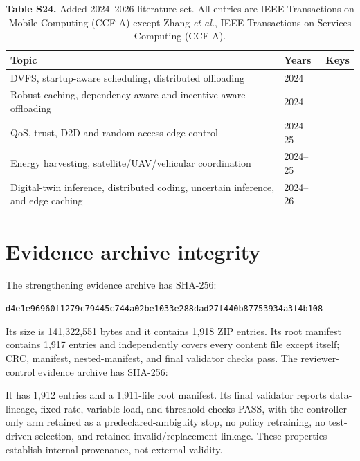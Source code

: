 \documentclass[10pt,a4paper]{article}
\begin{document}
\begin{table}[h!]
\centering\scriptsize
\caption*{\textbf{Table S24.} Added 2024--2026 literature set. All entries are IEEE Transactions on Mobile Computing (CCF-A) except Zhang \emph{et al.}, IEEE Transactions on Services Computing (CCF-A).}
\begin{tabular}{p{}ll}
\toprule
Topic & Years & Keys\\\midrule
DVFS, startup-aware scheduling, distributed offloading & 2024 & \cite{Zhang2024DVFO,Lou2024Startup,Kim2024DistributedOffload}\\
Robust caching, dependency-aware and incentive-aware offloading & 2024 & \cite{Chen2024ABR,Feng2024PRAISE,Tutuncuoglu2024Serverless,Hu2024MICDA}\\
QoS, trust, D2D and random-access edge control & 2024--25 & \cite{Maleki2024QCS,Wang2025TrustOffload,Hu2025SITOff,Han2025OffloadingGame}\\
Energy harvesting, satellite/UAV/vehicular coordination & 2024--25 & \cite{Zhang2024Satellite,Luo2025SolarEdge,Gong2025UAV3D,Zhao2025COHCTO}\\
Digital-twin inference, distributed coding, uncertain inference, and edge caching & 2024--26 & \cite{Zhang2024AoI,Qiu2026Barycentric,Nan2026RobustDNN,Luo2025EdgeCache,Li2024FIMI}\\
\bottomrule
\end{tabular}
\end{table}

\section{Evidence archive integrity}
The strengthening evidence archive has SHA-256:
\begin{center}\small\texttt{d4e1e96960f1279c79445c744a02be1033e288dad27f440b87753934a3f4b108}\end{center}
Its size is 141,322,551 bytes and it contains 1,918 ZIP entries. Its root manifest contains 1,917 entries and independently covers every content file except itself; CRC, manifest, nested-manifest, and final validator checks pass. The reviewer-control evidence archive has SHA-256:
\begin{center}\small{}\end{center}
It has 1,912 entries and a 1,911-file root manifest. Its final validator reports data-lineage, fixed-rate, variable-load, and threshold checks PASS, with the controller-only arm retained as a predeclared-ambiguity stop, no policy retraining, no test-driven selection, and retained invalid/replacement linkage. These properties establish internal provenance, not external validity.
\clearpage


\end{document}
